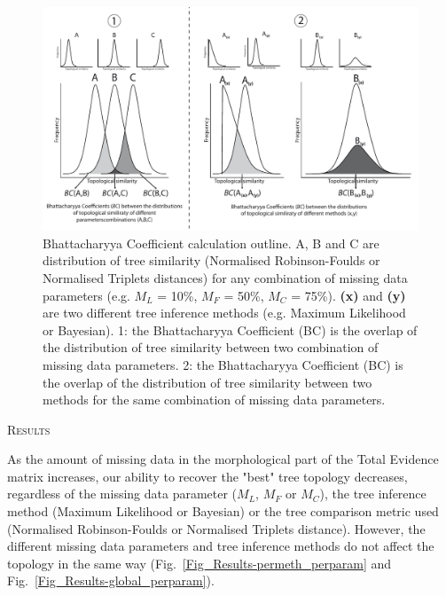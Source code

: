 \documentclass[12pt,letterpaper]{article}
\renewcommand{\section}[1]{%
\bigskip
\begin{center}
\begin{Large}
\normalfont\scshape #1
\medskip
\end{Large}
\end{center}}
\begin{document}
\begin{figure} 
\centering
    \includegraphics[width=1\textwidth]{Figures/In_main/Bhattacharyya_Coefficients.pdf}
\caption{Bhattacharyya Coefficient calculation outline. A, B and C are distribution of tree similarity (Normalised Robinson-Foulds or Normalised Triplets distances) for any combination of missing data parameters (e.g. $M_{L}$ = 10\%, $M_{F}$ = 50\%, $M_{C}$ = 75\%). \textbf{(x)} and \textbf{(y)} are two different tree inference methods (e.g. Maximum Likelihood or Bayesian). 1: the Bhattacharyya Coefficient (BC) is the overlap of the distribution of tree similarity between two combination of missing data parameters. 2: the Bhattacharyya Coefficient (BC) is the overlap of the distribution of tree similarity between two methods for the same combination of missing data parameters.}
\label{Fig_Bhattacharyya_Coefficients} %
\end{figure}

%
%

\section{Results}
As the amount of missing data in the morphological part of the Total Evidence matrix increases, our ability to recover the "best" tree topology decreases, regardless of the missing data parameter ($M_{L}$, $M_{F}$ or $M_{C}$), the tree inference method (Maximum Likelihood or Bayesian) or the tree comparison metric used (Normalised Robinson-Foulds or Normalised Triplets distance). However, the different missing data parameters and tree inference methods do not affect the topology in the same way (Fig.~\ref{Fig_Results-permeth_perparam} and Fig.~\ref{Fig_Results-global_perparam}).
\end{document}

